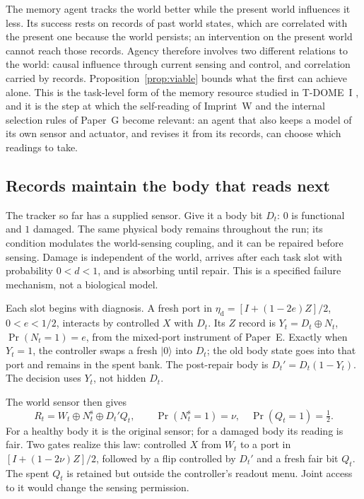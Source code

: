 \documentclass[11pt,a4paper]{article}
\begin{document}
The memory agent tracks the world better while the present world influences it less. Its success rests on records of past world states, which are correlated with the present one because the world persists; an intervention on the present world cannot reach those records. Agency therefore involves two different relations to the world: causal influence through current sensing and control, and correlation carried by records. Proposition~\ref{prop:viable} bounds what the first can achieve alone. This is the task-level form of the memory resource studied in T-DOME~I \cite{LiuTDOMEI}, and it is the step at which the self-reading of Imprint~W \cite{LiuWorldImprint} and the internal selection rules of Paper~G become relevant: an agent that also keeps a model of its own sensor and actuator, and revises it from its records, can choose which readings to take.

\subsection{Records maintain the body that reads next}\label{subsec:body}

The tracker so far has a supplied sensor. Give it a body bit \(D_t\):
\(0\) is functional and \(1\) damaged. The same physical body remains
throughout the run; its condition modulates the world-sensing coupling,
and it can be repaired before sensing. Damage is independent of the
world, arrives after each task slot with probability \(0<d<1\), and is
absorbing until repair. This is a specified failure mechanism, not a
biological model.

Each slot begins with diagnosis. A fresh port in
\(\eta_{\mathrm d}=[I+(1-2e)Z]/2\), \(0<e<1/2\), interacts by
controlled \(X\) with \(D_t\). Its \(Z\) record is
\(Y_t=D_t\oplus N_t\), \(\Pr(N_t=1)=e\), from the mixed-port
instrument of Paper~E. Exactly when \(Y_t=1\), the controller swaps a
fresh \(|0\rangle\) into \(D_t\); the old body state goes into that port
and remains in the spent bank. The post-repair body is
\(D_t'=D_t(1-Y_t)\). The decision uses \(Y_t\), not hidden \(D_t\).

The world sensor then gives
\begin{equation}\label{eq:bodysensor}
R_t=W_t\oplus N_t^{\mathrm s}\oplus D_t'Q_t,
\qquad \Pr(N_t^{\mathrm s}=1)=\nu,\quad \Pr(Q_t=1)=\tfrac12.
\end{equation}
For a healthy body it is the original sensor; for a damaged body its
reading is fair. Two gates realize this law: controlled \(X\) from
\(W_t\) to a port in \([I+(1-2\nu)Z]/2\), followed by a flip
controlled by \(D_t'\) and a fresh fair bit \(Q_t\).
The spent \(Q_t\) is retained but outside the controller's readout
menu. Joint access to it would change the sensing permission.
\end{document}
